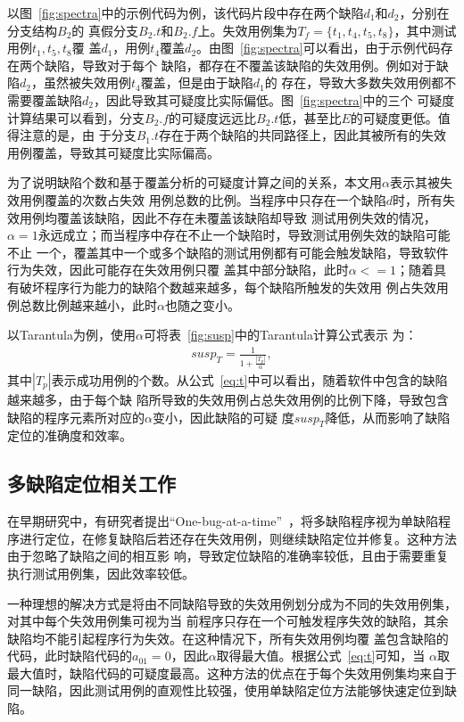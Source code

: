 以图~\ref{fig:spectra}中的示例代码为例，该代码片段中存在两个缺陷$d_1$和$d_2$，分别在分支结构$B_2$的
真假分支$B_2.t$和$B_2.f$上。失效用例集为$T_f=\{t_1, t_4, t_5, t_8\}$，其中测试用例$t_1, t_5, t_8$覆
盖$d_1$，用例$t_4$覆盖$d_2$。由图~\ref{fig:spectra}可以看出，由于示例代码存在两个缺陷，导致对于每个
缺陷，都存在不覆盖该缺陷的失效用例。例如对于缺陷$d_2$，虽然被失效用例$t_4$覆盖，但是由于缺陷$d_1$的
存在，导致大多数失效用例都不需要覆盖缺陷$d_2$，因此导致其可疑度比实际偏低。图~\ref{fig:spectra}中的三个
可疑度计算结果可以看到，分支$B_2.f$的可疑度远远比$B_2.t$低，甚至比$E$的可疑度更低。值得注意的是，由
于分支$B_1.t$存在于两个缺陷的共同路径上，因此其被所有的失效用例覆盖，导致其可疑度比实际偏高。

为了说明缺陷个数和基于覆盖分析的可疑度计算之间的关系，本文用$\alpha$表示其被失效用例覆盖的次数占失效
用例总数的比例。当程序中只存在一个缺陷$d$时，所有失效用例均覆盖该缺陷，因此不存在未覆盖该缺陷却导致
测试用例失效的情况，$\alpha=1$永远成立；而当程序中存在不止一个缺陷时，导致测试用例失效的缺陷可能不止
一个，覆盖其中一个或多个缺陷的测试用例都有可能会触发缺陷，导致软件行为失效，因此可能存在失效用例只覆
盖其中部分缺陷，此时$\alpha<=1$；随着具有破坏程序行为能力的缺陷个数越来越多，每个缺陷所触发的失效用
例占失效用例总数比例越来越小，此时$\alpha$也随之变小。

以Tarantula\cite{jones2005empirical}为例，使用$\alpha$可将表~\ref{fig:susp}中的Tarantula计算公式表示
为：
\begin{eqnarray}
 susp_T = \frac{1}{1+\frac{|T_p|}{\alpha}}, \label{eq:t}
\end{eqnarray}
其中$|T_p|$表示成功用例的个数。从公式~\eqref{eq:t}中可以看出，随着软件中包含的缺陷越来越多，由于每个缺
陷所导致的失效用例占总失效用例的比例下降，导致包含缺陷的程序元素所对应的$\alpha$变小，因此缺陷的可疑
度$susp_T$降低，从而影响了缺陷定位的准确度和效率。

\subsection{多缺陷定位相关工作}
在早期研究中，有研究者提出``One-bug-at-a-time''~\cite{klahr1988cognitive}，将多缺陷程序视为单缺陷程
序进行定位，在修复缺陷后若还存在失效用例，则继续缺陷定位并修复。这种方法由于忽略了缺陷之间的相互影
响，导致定位缺陷的准确率较低，且由于需要重复执行测试用例集，因此效率较低。

一种理想的解决方式是将由不同缺陷导致的失效用例划分成为不同的失效用例集，对其中每个失效用例集可视为当
前程序只存在一个可触发程序失效的缺陷，其余缺陷均不能引起程序行为失效。在这种情况下，所有失效用例均覆
盖包含缺陷的代码，此时缺陷代码的$a_{01}=0$，因此$\alpha$取得最大值。根据公式~\eqref{eq:t}可知，当
$\alpha$取最大值时，缺陷代码的可疑度最高。这种方法的优点在于每个失效用例集均来自于同一缺陷，因此测试用例的直观性比较强，使用单缺陷定位方法能够快速定位到缺陷。


